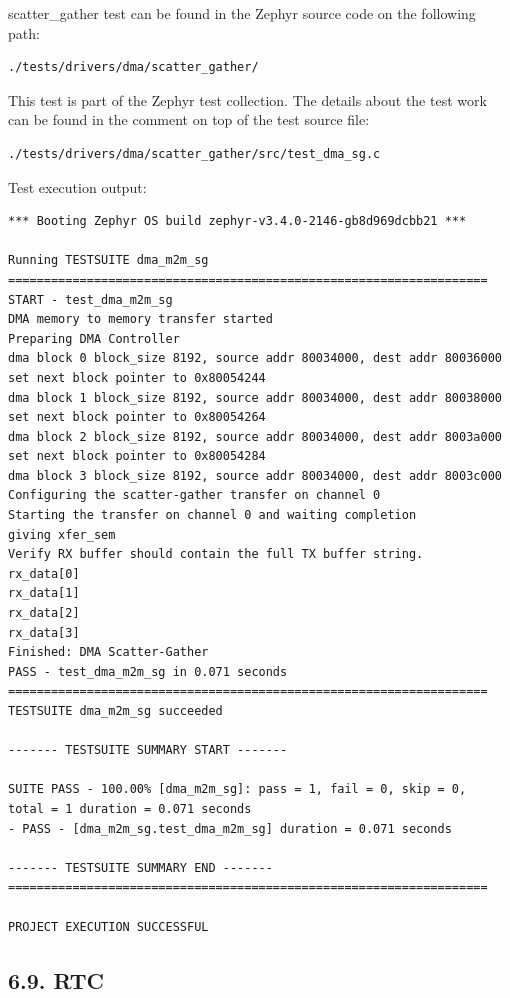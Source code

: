\documentclass[11pt,a4paper,oneside]{article}
\begin{document}
scatter\_gather test can be found in the Zephyr source code on the
following path:
\begin{lstlisting}
./tests/drivers/dma/scatter_gather/
\end{lstlisting}

This test is part of the Zephyr test collection. The details about the
test work can be found in the comment on top of the test source file:
\begin{lstlisting}
./tests/drivers/dma/scatter_gather/src/test_dma_sg.c
\end{lstlisting}

Test execution output:

\begin{lstlisting}
*** Booting Zephyr OS build zephyr-v3.4.0-2146-gb8d969dcbb21 ***

Running TESTSUITE dma_m2m_sg
===================================================================
START - test_dma_m2m_sg
DMA memory to memory transfer started
Preparing DMA Controller
dma block 0 block_size 8192, source addr 80034000, dest addr 80036000
set next block pointer to 0x80054244
dma block 1 block_size 8192, source addr 80034000, dest addr 80038000
set next block pointer to 0x80054264
dma block 2 block_size 8192, source addr 80034000, dest addr 8003a000
set next block pointer to 0x80054284
dma block 3 block_size 8192, source addr 80034000, dest addr 8003c000
Configuring the scatter-gather transfer on channel 0
Starting the transfer on channel 0 and waiting completion
giving xfer_sem
Verify RX buffer should contain the full TX buffer string.
rx_data[0]
rx_data[1]
rx_data[2]
rx_data[3]
Finished: DMA Scatter-Gather
PASS - test_dma_m2m_sg in 0.071 seconds
===================================================================
TESTSUITE dma_m2m_sg succeeded

------- TESTSUITE SUMMARY START -------

SUITE PASS - 100.00% [dma_m2m_sg]: pass = 1, fail = 0, skip = 0,
total = 1 duration = 0.071 seconds
- PASS - [dma_m2m_sg.test_dma_m2m_sg] duration = 0.071 seconds

------- TESTSUITE SUMMARY END -------
===================================================================

PROJECT EXECUTION SUCCESSFUL
\end{lstlisting}

\subsection*{6.9. RTC}\label{rtc}
\end{document}
